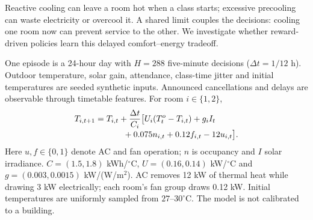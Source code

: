\documentclass[10pt,a4paper]{article}
\newcommand{\sect}[1]{\vspace{5pt}\noindent{\large\bfseries #1}\par\vspace{1pt}}
\begin{document}

\sect{1. Problem and environment}
Reactive cooling can leave a room hot when a class starts; excessive precooling
can waste electricity or overcool it. A shared limit couples the decisions:
cooling one room now can prevent service to the other. We investigate whether
reward-driven policies learn this delayed comfort--energy tradeoff.

One episode is a 24-hour day with $H=288$ five-minute decisions
($\Delta t=1/12$ h). Outdoor temperature, solar gain, attendance, class-time jitter
and initial temperatures are seeded synthetic inputs. Announced cancellations
and delays are observable through timetable features. For room $i\in\{1,2\}$,
\begin{align}
T_{i,t+1}={}&T_{i,t}+\frac{\Delta t}{C_i}\big[
U_i(T_t^o-T_{i,t})+g_i I_t \notag\\[-2pt]
&\qquad +0.075n_{i,t}+0.12f_{i,t}-12u_{i,t}\big].
\label{eq:thermal}
\end{align}
Here $u,f\in\{0,1\}$ denote AC and fan operation; $n$ is occupancy and $I$ solar
irradiance. $C=(1.5,1.8)$ kWh/$^{\circ}$C, $U=(0.16,0.14)$ kW/$^{\circ}$C and
$g=(0.003,0.0015)$ kW/(W/m$^2$). AC removes 12 kW of thermal heat while drawing
3 kW electrically; each room's fan group draws 0.12 kW. Initial temperatures are
uniformly sampled from $27$--$30^{\circ}$C. The model is not calibrated to a building.
\end{document}

